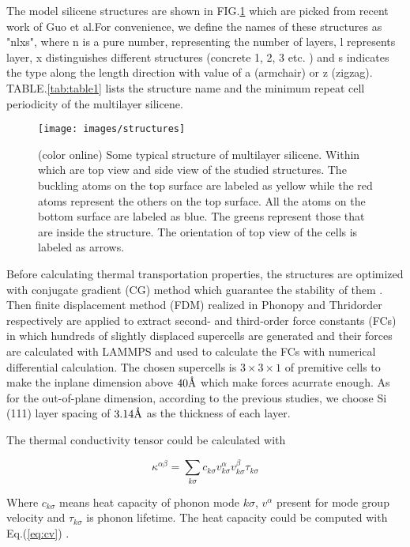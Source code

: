 \documentclass[%
 reprint,
 amsmath,amssymb,
 aps,
 prb,
]{revtex4-1}
\newcommand{\angstrom}{\mbox{\normalfont\AA}}
\begin{document}
The model silicene structures are shown in FIG.\ref{fig:structures} which are picked from recent work of Guo et al\cite{Guo2015Structural}.For convenience, we define the names of these structures as "nlxs", where n is a pure number, representing the number of layers, l represents layer, x distinguishes different structures (concrete 1, 2, 3 etc. ) and s indicates the type along the length direction with value of a (armchair) or z (zigzag). TABLE.\ref{tab:table1} lists the structure name and  the minimum repeat cell periodicity of the multilayer silicene.

\begin{figure}[b]
  \texttt{[image: images/structures]}
  \caption{\label{fig:structures}  (color online) Some typical structure of multilayer silicene. Within which  are top view and side view of the studied structures. The buckling atoms on the top surface are labeled as yellow while the red atoms represent the others on the top surface. All the atoms on the bottom surface are labeled as blue. The greens represent those that are inside the structure. The orientation of top view of the cells is labeled as arrows.}
\end{figure}

Before calculating thermal transportation properties, the  structures are  optimized with  conjugate gradient (CG) method which guarantee the stability of them .  Then finite displacement method (FDM) realized in Phonopy\cite{Togo2008} and Thridorder respectively are applied to extract second- and third-order force constants (FCs) in which hundreds of  slightly displaced supercells are generated and their forces are calculated with LAMMPS and used to calculate the FCs with  numerical differential calculation. The chosen supercells is $3 \times 3 \times 1$ of premitive cells to make the inplane dimension above  $40\angstrom$ which make  forces acurrate enough. As for the out-of-plane dimension, according to the previous studies, we choose Si (111) layer spacing of $3.14 \angstrom$ as the thickness of each layer.

The thermal conductivity tensor could be calculated with

\begin{equation}
  \kappa^{\alpha\beta} = \sum_{k \sigma}{c_{k \sigma}v^{\alpha}_{k \sigma}v^{\beta}_{k \sigma}\tau_{k \sigma}} \label{eq:kappasum}
\end{equation}

Where $c_{k \sigma}$ means heat capacity of phonon mode $k \sigma$, $v^{\alpha}$ present for mode group velocity and $\tau_{k \sigma}$ is phonon lifetime. The heat capacity  could be computed with Eq.(\ref{eq:cv}) .
\end{document}
